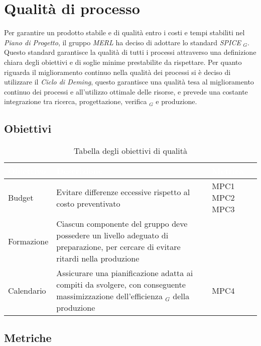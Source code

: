 \chapter{Qualità di processo}
Per garantire un prodotto stabile e di qualità entro i costi e tempi stabiliti nel \textit{Piano di Progetto}, il gruppo \textit{MERL} ha deciso di adottare lo standard \textit{SPICE} $_G$. Questo standard garantisce la qualità di tutti i processi attraverso una definizione chiara degli obiettivi e di soglie minime prestabilite da rispettare.
Per quanto riguarda il miglioramento continuo nella qualità dei processi si è deciso di utilizzare il \textit{Ciclo di Deming}, questo garantisce una qualità tesa al miglioramento continuo dei processi e all'utilizzo ottimale delle risorse, e prevede una costante integrazione tra ricerca, progettazione, verifica $_G$ e produzione.

\section{Obiettivi}
\begin{table}[H]
  \renewcommand{\arraystretch}{1.25}
  \begin{tabular}{|p{2.5cm}|p{8cm}|p{1.7cm}|} \hline
    \rowcolor[HTML]{036400}
    \textcolor{white}{\textbf{Obiettivo}} & \textcolor{white}{\textbf{Descrizione}} & \textcolor{white}{\textbf{Metrica}}  \\ \hline
    \rowcolor[HTML]{EFEFEF}
    Budget & Evitare differenze eccessive rispetto al costo preventivato & MPC1 \newline MPC2 \newline MPC3     \\ \hline
    \rowcolor[HTML]{C0C0C0}
    Formazione & Ciascun componente del gruppo deve possedere un livello adeguato di preparazione, per cercare di evitare ritardi nella produzione   & \    \\ \hline
    \rowcolor[HTML]{EFEFEF}
    Calendario & Assicurare una pianificazione adatta ai compiti da svolgere, con conseguente massimizzazione dell'efficienza $_G$ della produzione  & MPC4       \\ \hline
  \end{tabular}
  \caption{Tabella degli obiettivi di qualità}
\end{table}

\newpage

\section{Metriche}

